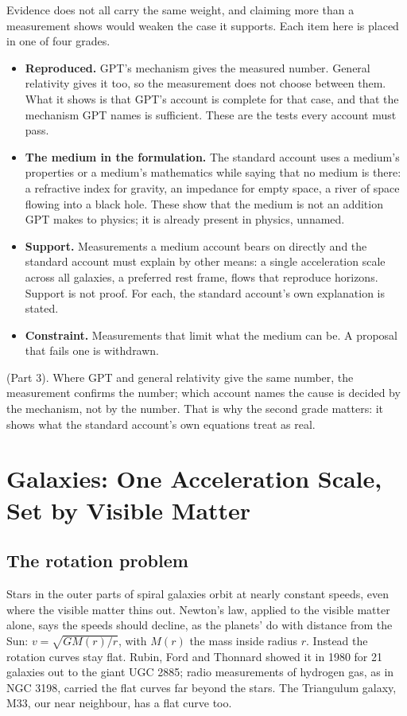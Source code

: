 Evidence does not all carry the same weight, and claiming more than a measurement shows would weaken the case it supports. Each item here is placed in one of four grades.
\begin{itemize}
\item \textbf{Reproduced.} GPT's mechanism gives the measured number. General relativity gives it too, so the measurement does not choose between them. What it shows is that GPT's account is complete for that case, and that the mechanism GPT names is sufficient. These are the tests every account must pass.
\item \textbf{The medium in the formulation.} The standard account uses a medium's properties or a medium's mathematics while saying that no medium is there: a refractive index for gravity, an impedance for empty space, a river of space flowing into a black hole. These show that the medium is not an addition GPT makes to physics; it is already present in physics, unnamed.
\item \textbf{Support.} Measurements a medium account bears on directly and the standard account must explain by other means: a single acceleration scale across all galaxies, a preferred rest frame, flows that reproduce horizons. Support is not proof. For each, the standard account's own explanation is stated.
\item \textbf{Constraint.} Measurements that limit what the medium can be. A proposal that fails one is withdrawn.
\end{itemize}

 (Part 3). Where GPT and general relativity give the same number, the measurement confirms the number; which account names the cause is decided by the mechanism, not by the number. That is why the second grade matters: it shows what the standard account's own equations treat as real.

\section{Galaxies: One Acceleration Scale, Set by Visible Matter}

\subsection{The rotation problem}

Stars in the outer parts of spiral galaxies orbit at nearly constant speeds, even where the visible matter thins out. Newton's law, applied to the visible matter alone, says the speeds should decline, as the planets' do with distance from the Sun: $v = \sqrt{GM(r)/r}$, with $M(r)$ the mass inside radius $r$. Instead the rotation curves stay flat. Rubin, Ford and Thonnard showed it in 1980 for 21 galaxies out to the giant UGC 2885; radio measurements of hydrogen gas, as in NGC 3198, carried the flat curves far beyond the stars. The Triangulum galaxy, M33, our near neighbour, has a flat curve too.

